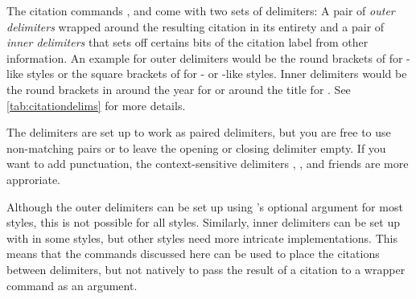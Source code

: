 \documentclass[11pt,a4paper]{article}
\begin{document}
The citation commands ,  and  come with
two sets of delimiters: A pair of \emph{outer delimiters} wrapped around the
resulting citation in its entirety and a pair of \emph{inner delimiters} that
sets off certains bits of the citation label from other information.
An example for outer delimiters would be the round brackets of 
for -like styles or the
square brackets of  for - or
-like styles.
Inner delimiters would be the round brackets in  around
the year for  or around the title for
.
See \cref{tab:citationdelims} for more details.

The delimiters are set up to work as paired delimiters, but you are free to
use non-matching pairs or to leave the opening or closing delimiter empty.
If you want to add punctuation, the context-sensitive delimiters
, ,
 and friends are more approriate.

\begin{remindbox}
Although the outer delimiters can be set up using 's
optional  argument for most styles, this is not possible for all
styles.
Similarly, inner delimiters can be set up with  in some
styles, but other styles need more intricate implementations.
This means that the commands discussed here can be used to place the citations
between delimiters, but not natively to pass the result of a citation to a
wrapper command as an argument.
\end{remindbox}
\end{document}
